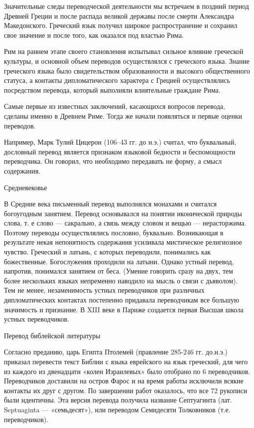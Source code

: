 Значительные следы переводческой деятельности мы встречаем в поздний период Древней Греции и после распада великой державы после смерти Александра Македонского. Греческий язык получил широкое распространение и сохранил свое значение и после того, как оказался под властью Рима.

Рим на раннем этапе своего становления испытывал сильное влияние греческой культуры, и основной объем переводов осуществлялся с греческого языка. Знание греческого языка было свидетельством образованности и высокого общественного статуса, а контакты дипломатического характера с Грецией осуществлялись посредством перевода, который выполняли влиятельные граждане Рима.

Самые первые из известных заключений, касающихся вопросов перевода, сделаны именно в Древнем Риме. Тогда же начали появляться и первые оценки переводов.

Например, Марк Тулий Цицерон (106--43 гг. до н.э.) считал, что буквальный, дословный перевод является признаком языковой бедности и беспомощности переводчика. Он говорил, что необходимо передавать не форму, а смысл содержания.

Средневековье

В Средние века письменный перевод выполнялся монахами и считался богоугодным занятием. Перевод основывался на понятии иконической природы слова, т. е слово --- сакрально, а связь между словом и вещью --- нерасторжима. Поэтому переводы осуществлялись пословно, буквально. Возникающая в результате некая непонятность содержания усиливала мистическое религиозное чувство. Греческий и латынь, с которых переводили, понимались как божественные. Богослужения проходили на латыни. Однако устный перевод, напротив, понимался занятием от беса. (Умение говорить сразу на двух, тем более нескольких языках непременно наводило на мысль о связи с дьяволом). Тем не менее, незаменимость устных переводчиков при различных дипломатических контактах постепенно придавала переводчикам все большую значимость и признание. В XIII веке в Париже создается первая Высшая школа устных переводчиков.

Перевод библейской литературы

Согласно преданию, царь Египта Птолемей (правление 285-246 гг. до.н.э.) приказал перевести текст Библии с языка еврейского на язык греческий, для чего из каждого из двенадцати «колен Израилевых» было отобрано по 6 переводчиков. Переводчиков доставили на остров Фарос и на время работы исключили всякие контакты их друг с другом. По завершении работ оказалось, что все 72 рукописи были идентичны. Эта версия перевода получила название Септуагинта (лат. Septuaginta --- «семьдесят»), или переводом Семидесяти Толковников (т.е. переводчиков).

